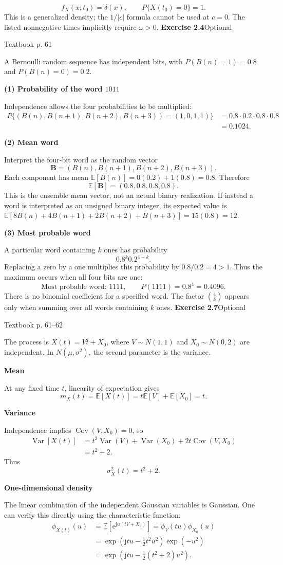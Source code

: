 \documentclass[a4paper,11pt]{article}
\newcommand{\E}{\mathbb E}\newcommand{\Var}{\operatorname{Var}}\newcommand{\Cov}{\operatorname{Cov}}
\newcommand{\jj}{\mathrm j}\newcommand{\ee}{\mathrm e}
\newcommand{\problem}[3]{{\LARGE\bfseries Exercise #1}\hfill #2\par{\small\color{gray}Textbook p. #3}\par\vspace{3mm}}
\newcommand{\step}[1]{\par\textbf{#1}\par}
\begin{document}
\[
\boxed{f_X(x;t_0)=\delta(x),\qquad P\{X(t_0)=0\}=1.}
\]
This is a generalized density; the $1/|c|$ formula cannot be used at $c=0$. The listed nonnegative times implicitly require $\omega>0$.
\newpage
\problem{2.4}{Optional}{61}
A Bernoulli random sequence has independent bits, with $P(B(n)=1)=0.8$ and $P(B(n)=0)=0.2$.
\step{(1) Probability of the word $1011$}
Independence allows the four probabilities to be multiplied:
\begin{align*}
P\{(B(n),B(n+1),B(n+2),B(n+3))=(1,0,1,1)\}
&=0.8\cdot0.2\cdot0.8\cdot0.8\\
&=\boxed{0.1024}.
\end{align*}
\step{(2) Mean word}
Interpret the four-bit word as the random vector
\[
\boldsymbol B=(B(n),B(n+1),B(n+2),B(n+3)).
\]
Each component has mean $\E[B(n)]=0(0.2)+1(0.8)=0.8$. Therefore
\[
\boxed{\E[\boldsymbol B]=(0.8,0.8,0.8,0.8).}
\]
This is the ensemble mean vector, not an actual binary realization.
If instead a word is interpreted as an unsigned binary integer, its expected value is
$\E[8B(n)+4B(n+1)+2B(n+2)+B(n+3)]=15(0.8)=12$.
\step{(3) Most probable word}
A particular word containing $k$ ones has probability
\[
0.8^k0.2^{4-k}.
\]
Replacing a zero by a one multiplies this probability by $0.8/0.2=4>1$. Thus the maximum occurs when all four bits are one:
\[
\boxed{\text{Most probable word: }1111,\qquad P(1111)=0.8^4=0.4096.}
\]
There is no binomial coefficient for a specified word. The factor $\binom4k$ appears only when summing over all words containing $k$ ones.
\newpage
\problem{2.7}{Optional}{61--62}
The process is $X(t)=Vt+X_0$, where $V\sim N(1,1)$ and $X_0\sim N(0,2)$ are independent. In $N(\mu,\sigma^2)$, the second parameter is the variance.
\step{Mean}
At any fixed time $t$, linearity of expectation gives
\[
\boxed{m_X(t)=\E[X(t)]=t\E[V]+\E[X_0]=t.}
\]
\step{Variance}
Independence implies $\Cov(V,X_0)=0$, so
\begin{align*}
\Var[X(t)]&=t^2\Var(V)+\Var(X_0)+2t\Cov(V,X_0)\\
&=t^2+2.
\end{align*}
Thus
\[
\boxed{\sigma_X^2(t)=t^2+2.}
\]
\step{One-dimensional density}
The linear combination of the independent Gaussian variables is Gaussian. One can verify this directly using the characteristic function:
\begin{align*}
\phi_{X(t)}(u)&=\E[\ee^{\jj u(tV+X_0)}]
=\phi_V(tu)\phi_{X_0}(u)\\
&=\exp\left(\jj tu-\frac12t^2u^2\right)\exp(-u^2)\\
&=\exp\left(\jj tu-\frac12(t^2+2)u^2\right).
\end{align*}
\end{document}

